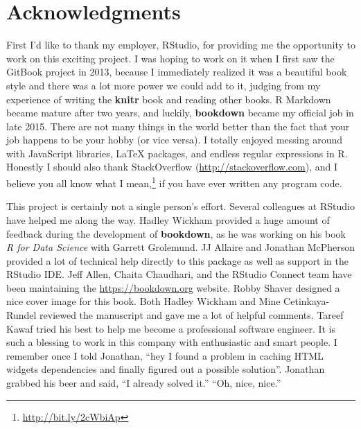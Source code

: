 \documentclass[12pt,]{krantz}
\renewcommand{\href}[2]{#2\footnote{\url{#1}}}
\begin{document}
\hypertarget{acknowledgments}{%
\section*{Acknowledgments}\label{acknowledgments}}


First I'd like to thank my employer, RStudio, for providing me the opportunity to work on this exciting project. I was hoping to work on it when I first saw the GitBook project in 2013, because I immediately realized it was a beautiful book style and there was a lot more power we could add to it, judging from my experience of writing the \textbf{knitr} book \citep{xie2015} and reading other books. R Markdown became mature after two years, and luckily, \textbf{bookdown} became my official job in late 2015. There are not many things in the world better than the fact that your job happens to be your hobby (or vice versa). I totally enjoyed messing around with JavaScript libraries, LaTeX packages, and endless regular expressions in R. Honestly I should also thank StackOverflow (\url{http://stackoverflow.com}), and I believe you all know \href{http://bit.ly/2cWbiAp}{what I mean,} if you have ever written any program code.

This project is certainly not a single person's effort. Several colleagues at RStudio have helped me along the way. Hadley Wickham provided a huge amount of feedback during the development of \textbf{bookdown}, as he was working on his book \emph{R for Data Science} with Garrett Grolemund. JJ Allaire and Jonathan McPherson provided a lot of technical help directly to this package as well as support in the RStudio IDE. Jeff Allen, Chaita Chaudhari, and the RStudio Connect team have been maintaining the \url{https://bookdown.org} website. Robby Shaver designed a nice cover image for this book. Both Hadley Wickham and Mine Cetinkaya-Rundel reviewed the manuscript and gave me a lot of helpful comments. Tareef Kawaf tried his best to help me become a professional software engineer. It is such a blessing to work in this company with enthusiastic and smart people. I remember once I told Jonathan, ``hey I found a problem in caching HTML widgets dependencies and finally figured out a possible solution''. Jonathan grabbed his beer and said, ``I already solved it.'' ``Oh, nice, nice.''
\end{document}
